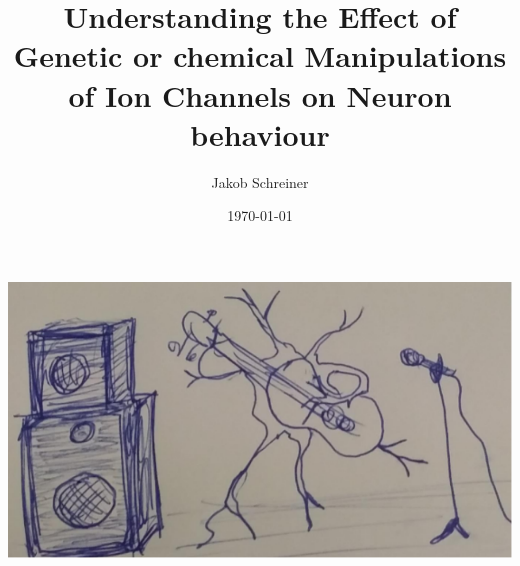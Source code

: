 \documentclass[british, a4paper, reqno, twosize]{scrartcl}   %
\author{Jakob Schreiner}
\title{Understanding the Effect of Genetic or chemical Manipulations of Ion Channels on Neuron behaviour}
\date{\today}
\begin{document}
\maketitle


\begin{center}
    \includegraphics[scale=0.5]{images/neuron.pdf}
\end{center}




\printbibliography
\end{document}
